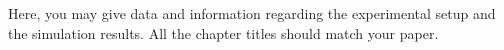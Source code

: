 Here, you may give data and information regarding the experimental setup and 
the simulation results. All the chapter titles should match your paper.



